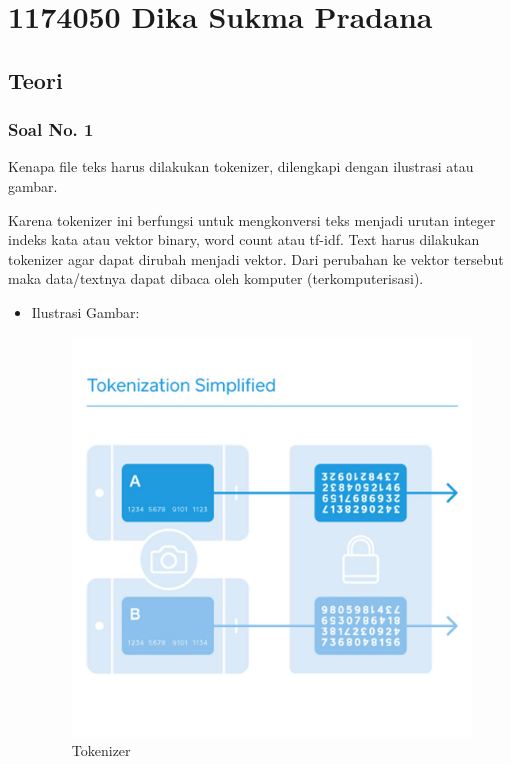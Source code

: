 \section{1174050 Dika Sukma Pradana}
\subsection{Teori}
\subsubsection{Soal No. 1}
Kenapa file teks harus dilakukan tokenizer, dilengkapi dengan ilustrasi atau gambar.

Karena tokenizer ini berfungsi untuk mengkonversi teks menjadi urutan integer indeks kata atau vektor binary, word count atau tf-idf. Text harus dilakukan tokenizer agar dapat dirubah menjadi vektor. Dari perubahan ke vektor tersebut maka data/textnya dapat dibaca oleh komputer (terkomputerisasi).

\begin{itemize}
\item Ilustrasi Gambar:

\begin{figure}[!hbtp]
\centering
\includegraphics[scale=0.2]{figures/1174050/chapter7/1.jpg}
\caption{Tokenizer}
\end{figure}

\end{itemize}

